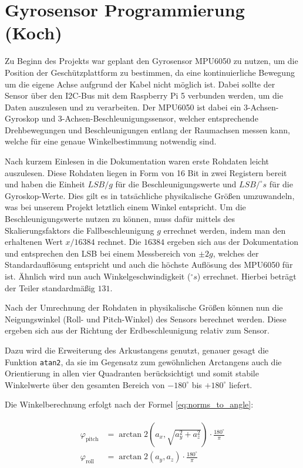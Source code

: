 \section{Gyrosensor Programmierung (Koch)}
Zu Beginn des Projekts war geplant den Gyrosensor MPU6050 zu nutzen, um die Position der Geschützplattform zu bestimmen, da eine kontinuierliche Bewegung um die eigene Achse aufgrund der Kabel nicht möglich ist. Dabei sollte der Sensor über den I2C-Bus mit dem Raspberry Pi 5 verbunden werden, um die Daten auszulesen und zu verarbeiten.
Der MPU6050 ist dabei ein 3-Achsen-Gyroskop und 3-Achsen-Beschleunigungssensor, welcher entsprechende Drehbewegungen und Beschleunigungen entlang der Raumachsen messen kann, welche für eine genaue Winkelbestimmung notwendig sind.

Nach kurzem Einlesen in die Dokumentation waren erste Rohdaten leicht auszulesen. Diese Rohdaten liegen in Form von 16 Bit in zwei Registern bereit und haben die Einheit $\mathit{LSB/g}$ für die Beschleunigungswerte und $\mathit{LSB/^\circ s}$ für die Gyroskop-Werte. Dies gilt es in tatsächliche physikalische Größen umzuwandeln, was bei unserem Projekt letztlich einem Winkel entspricht. 
Um die Beschleunigungswerte nutzen zu können, muss dafür mittels des Skalierungsfaktors die Fallbeschleunigung $\mathit{g}$ errechnet werden, indem man den erhaltenen Wert $x/16384$ rechnet. Die $16384$ ergeben sich aus der Dokumentation und entsprechen den LSB bei einem Messbereich von $\pm2g$, welches der Standardauflösung entspricht und auch die höchste Auflösung des MPU6050 für ist.
Ähnlich wird nun auch Winkelgeschwindigkeit ($\mathit{^\circ s}$) errechnet. Hierbei beträgt der Teiler standardmäßig $131$. \cite[S. 12-13]{raspberry_invensense_mpu6050_datasheet} 

Nach der Umrechnung der Rohdaten in physikalische Größen können nun die Neigungswinkel (Roll- und Pitch-Winkel) des Sensors berechnet werden. Diese ergeben sich aus der Richtung der Erdbeschleunigung relativ zum Sensor. 

Dazu wird die Erweiterung des Arkustangens genutzt, genauer gesagt die Funktion \texttt{atan2}, da sie im Gegensatz zum gewöhnlichen Arctangens auch die Orientierung in allen vier Quadranten berücksichtigt und somit stabile Winkelwerte über den gesamten Bereich von $-180^\circ$ bis $+180^\circ$ liefert. \cite{raspberry_matlab_atan2}

Die Winkelberechnung erfolgt nach der Formel \ref{eq:norms_to_angle}:

\begin{gather}
    \begin{aligned}
    \varphi_\text{pitch} &= \arctan2\left(a_x,\sqrt{a_y^2 + a_z^2}\right) \cdot \frac{180^\circ}{\pi} \\
    \varphi_\text{roll}  &= \arctan2\left(a_y, a_z\right) \cdot \frac{180^\circ}{\pi}
    \end{aligned}
    \label{eq:norms_to_angle}
\end{gather}


